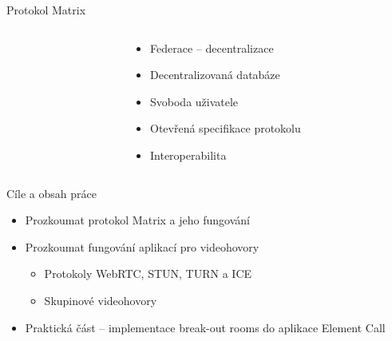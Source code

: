 \documentclass[aspectratio=169]{beamer}
\begin{document}
\begin{frame}{Protokol Matrix}
    \pause
    \begin{columns}
        \begin{column}{0.5\textwidth}
            \centering
        \end{column}
        \begin{column}{0.5\textwidth}
            \begin{itemize}[<+->]
                \item Federace -- decentralizace
                \item Decentralizovaná databáze
                \item Svoboda uživatele
                \item Otevřená specifikace protokolu
                \item Interoperabilita
            \end{itemize}
        \end{column}
    \end{columns}
\end{frame}
\begin{frame}{Cíle a obsah práce}
    \pause
    \begin{itemize}[<+->]
        \item Prozkoumat protokol Matrix a jeho fungování
        \item Prozkoumat fungování aplikací pro videohovory
              \begin{itemize}
                  \item Protokoly WebRTC, STUN, TURN a ICE
                  \item Skupinové videohovory
              \end{itemize}
        \item Praktická část -- implementace break-out rooms do aplikace Element Call
    \end{itemize}
\end{frame}
\end{document}
